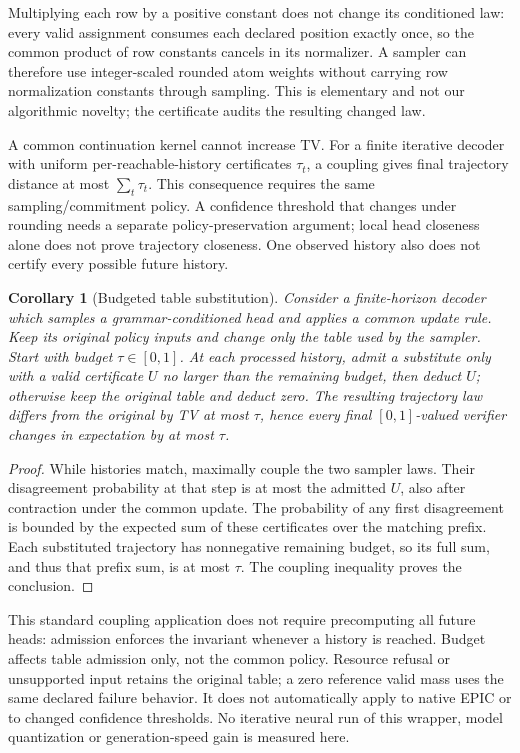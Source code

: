 \documentclass[11pt]{article}
\newtheorem{corollary}{Corollary}
\begin{document}
Multiplying each row by a positive constant does not change its conditioned
law: every valid assignment consumes each declared position exactly once,
so the common product of row constants cancels in its normalizer. A sampler
can therefore use integer-scaled rounded atom weights without carrying row
normalization constants through sampling. This is elementary and not our
algorithmic novelty; the certificate audits the resulting changed law.

A common continuation kernel cannot increase TV. For a finite iterative
decoder with uniform per-reachable-history certificates $\tau_t$, a coupling
gives final trajectory distance at most $\sum_t\tau_t$. This consequence
requires the same sampling/commitment policy. A confidence threshold that
changes under rounding needs a separate policy-preservation argument; local
head closeness alone does not prove trajectory closeness. One observed
history also does not certify every possible future history.

\begin{corollary}[Budgeted table substitution]\label{cor:budget}
Consider a finite-horizon decoder which samples a grammar-conditioned head
and applies a common update rule. Keep its original policy inputs and change
only the table used by the sampler. Start with budget $\tau\in[0,1]$. At each
processed history, admit a substitute only with a valid certificate $U$ no
larger than the remaining budget, then deduct $U$; otherwise keep the original
table and deduct zero. The resulting trajectory law differs from the original
by TV at most $\tau$, hence every final $[0,1]$-valued verifier changes in
expectation by at most $\tau$.
\end{corollary}
\begin{proof}
While histories match, maximally couple the two sampler laws. Their
disagreement probability at that step is at most the admitted $U$, also
after contraction under the common update. The probability of any first
disagreement is bounded by the expected sum of these certificates over the
matching prefix. Each substituted trajectory has nonnegative remaining
budget, so its full sum, and thus that prefix sum, is at most $\tau$.
The coupling inequality proves the conclusion.
\end{proof}

This standard coupling application does not require precomputing all future
heads: admission enforces the invariant whenever a history is reached.
Budget affects table admission only, not the common policy. Resource refusal
or unsupported input retains the original table; a zero reference valid mass
uses the same declared failure behavior. It does not automatically apply to
native EPIC or to changed confidence thresholds. No iterative neural run of
this wrapper, model quantization or generation-speed gain is measured here.
\end{document}
